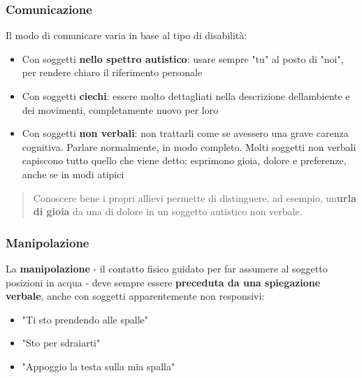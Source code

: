 \documentclass[a4paper,11pt]{article}
\providecommand{\tightlist}{%
  \setlength{\itemsep}{0pt}\setlength{\parskip}{0pt}}
\begin{document}
\subsubsection{Comunicazione}\label{comunicazione}

Il modo di comunicare varia in base al tipo di disabilità:

\begin{itemize}
      \tightlist
      \item
            Con soggetti \textbf{nello spettro autistico}: usare sempre "tu" al
            posto di "noi", per rendere chiaro il riferimento personale
      \item
            Con soggetti \textbf{ciechi}: essere molto dettagliati nella
            descrizione dell\textquotesingle ambiente e dei movimenti,
            completamente nuovo per loro
      \item
            Con soggetti \textbf{non verbali}: non trattarli come se avessero una
            grave carenza cognitiva. Parlare normalmente, in modo completo. Molti
            soggetti non verbali capiscono tutto quello che viene detto: esprimono
            gioia, dolore e preferenze, anche se in modi atipici
\end{itemize}

\begin{quote}
      Conoscere bene i propri allievi permette di distinguere, ad esempio,
      un\textquotesingle{}\textbf{urla di gioia} da una di dolore in un
      soggetto autistico non verbale.
\end{quote}

\subsubsection{Manipolazione}\label{manipolazione}

La \textbf{manipolazione} - il contatto fisico guidato per far assumere
al soggetto posizioni in acqua - deve sempre essere \textbf{preceduta da
      una spiegazione verbale}, anche con soggetti apparentemente non
responsivi:

\begin{itemize}
      \tightlist
      \item
            "Ti sto prendendo alle spalle"
      \item
            "Sto per sdraiarti"
      \item
            "Appoggio la testa sulla mia spalla"
\end{itemize}
\end{document}
